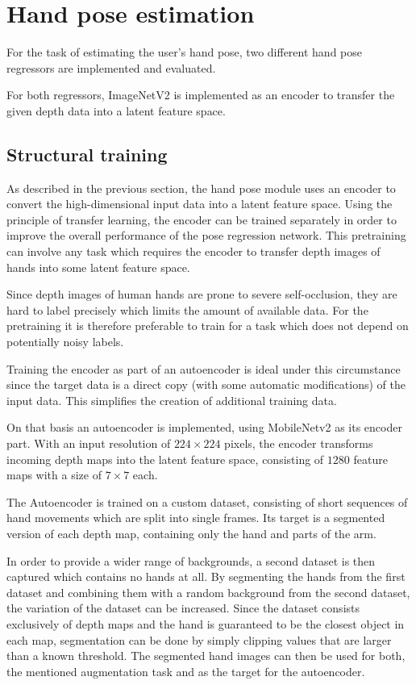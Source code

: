 \section{Hand pose estimation}
For the task of estimating the user's hand pose, two different hand pose regressors are implemented and evaluated.

For both regressors, ImageNetV2 \cite{Sandler} is implemented as an encoder to transfer the given depth data into a latent feature space. 

\subsection{Structural training}
As described in the previous section, the hand pose module uses an encoder to convert the high-dimensional input data into a latent feature space. 
Using the principle of transfer learning, the encoder can be trained separately in order to improve the overall performance of the pose regression network. This pretraining can involve any task which requires the encoder to transfer depth images of hands into some latent feature space.

Since depth images of human hands are prone to severe self-occlusion, they are hard to label precisely which limits the amount of available data. For the pretraining it is therefore preferable to train for a task which does not depend on potentially noisy labels. 

Training the encoder as part of an autoencoder is ideal under this circumstance since the target data is a direct copy (with some automatic modifications) of the input data. This simplifies the creation of additional training data.

On that basis an autoencoder is implemented, using MobileNetv2 \cite{Sandler} as its encoder part. With an input resolution of $224 \times 224$ pixels, the encoder transforms incoming depth maps into the latent feature space, consisting of $1280$ feature maps with a size of $7\times7$ each. 



The Autoencoder is trained on a custom dataset, consisting of short sequences of hand movements which are split into single frames. Its target is a segmented version of each depth map, containing only the hand and parts of the arm. 

In order to provide a wider range of backgrounds, a second dataset is then captured which contains no hands at all. By segmenting the hands from the first dataset and combining them with a random background from the second dataset, the variation of the dataset can be increased. Since the dataset consists exclusively of depth maps and the hand is guaranteed to be the closest object in each map, segmentation can be done by simply clipping values that are larger than a known threshold. The segmented hand images can then be used for both, the mentioned augmentation task and as the target for the autoencoder. 

